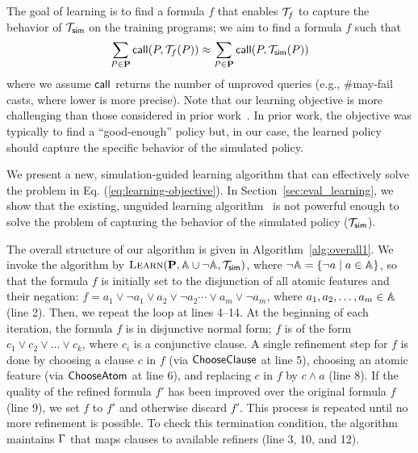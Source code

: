 The goal of learning is to find a formula $f$ that enables
$\mathcal{T}_f$ to capture the behavior of $\mathcal{T}_{{\sf sim}}$ on the training
programs; we aim to find a formula $f$ such that 
\begin{equation}\label{eq:learning-objective}
  \sum_{P\in\mathbf{P}} {\sf call}(P, \mathcal{T}_f(P)) \approx
  \sum_{P\in\mathbf{P}} {\sf call}(P, \mathcal{T}_{{\sf sim}}(P))
\end{equation}
where we assume ${\sf call}$ returns the number of unproved queries
(e.g., \#may-fail casts, where lower is more precise). 
Note that our learning objective is more challenging than those considered in
prior work~\cite{JeJeChOh17,JeJeOh18}. In prior work, the objective was
typically to find a ``good-enough'' policy but, in our case, the
learned policy should capture the specific behavior of the simulated
policy.


We present a new, simulation-guided learning algorithm that can effectively solve the problem in Eq. (\ref{eq:learning-objective}). In Section~\ref{sec:eval_learning}, we show that the existing, unguided learning algorithm~\cite{JeJeOh18} is not powerful enough to solve the problem of capturing the behavior of the simulated policy ($\mathcal{T}_{{\sf sim}}$). 

The overall structure of our algorithm is given in
Algorithm~\ref{alg:overall1}.
We invoke the algorithm by
$\textsc{Learn}(\mathbf{P}, \mathbb{A} \cup \neg\mathbb{A}, \mathcal{T}_{{\sf sim}})$, where
$\neg\mathbb{A} = \{ \neg a \mid a \in \mathbb{A} \}$, so that the formula $f$
is initially set to the disjunction of all atomic features and their
negation:
$f = a_1 \vee \neg a_1 \vee a_2 \vee \neg a_2 \cdots \vee a_m \vee
\neg a_m$, where $a_1, a_2, \dots, a_m \in \mathbb{A}$ (line 2).  Then, we
repeat the loop at lines 4--14.  At the beginning of each 
iteration, the formula $f$ is in disjunctive normal form; 
$f$ is of the form $c_1 \vee c_2 \vee \dots \vee c_k$, where $c_i$ is a
conjunctive clause.
A single refinement step for $f$ is done by choosing a clause $c$ in $f$ (via
${\sf ChooseClause}$ at line 5), choosing an atomic feature (via
${\sf ChooseAtom}$ at line 6), and replacing $c$ in $f$ by $c \land a$
(line 8).  If the quality of the refined formula $f'$ has been
improved over the original formula $f$ (line 9), we set $f$ to $f'$
and otherwise discard $f'$. This process is repeated until no more
refinement is possible. To check this termination condition, the
algorithm maintains $\Gamma$ that maps clauses to available
refiners (line 3, 10, and 12). %



